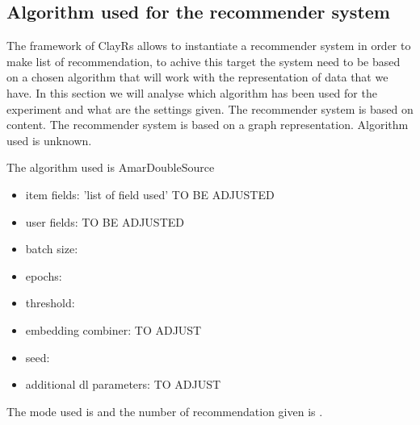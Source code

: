 \documentclass[11pt]{article}
\begin{document}
\subsection{Algorithm used for the recommender system}\label{subsec:algo}
The framework of ClayRs allows to instantiate a recommender system in order to make list of recommendation, to achive
this target the system need to be based on a chosen algorithm that will work with the representation of data that
we have.
In this section we will analyse which algorithm has been used for the experiment and what are the settings
given.
\hfill\break
\hfill\break
The recommender system is based on content.
\hfill\break
\hfill\break
{}
The recommender system is based on a graph representation.
\hfill\break
\hfill\break
{}
Algorithm used is unknown.
\hfill\break
\hfill\break
{}

The algorithm used is AmarDoubleSource
\begin{itemize}
    \item item fields: 'list of field used' TO BE ADJUSTED
    \item user fields: TO BE ADJUSTED
    \item batch size: 
    \item epochs: 
    \item threshold: 
    \item embedding combiner: TO ADJUST
    \item seed: 
    \item additional dl parameters: TO ADJUST
\end{itemize}
\hfill\break
\hfill\break
The mode used is  and the number of recommendation given is
.
\hfill\break
\hfill\break
\end{document}
